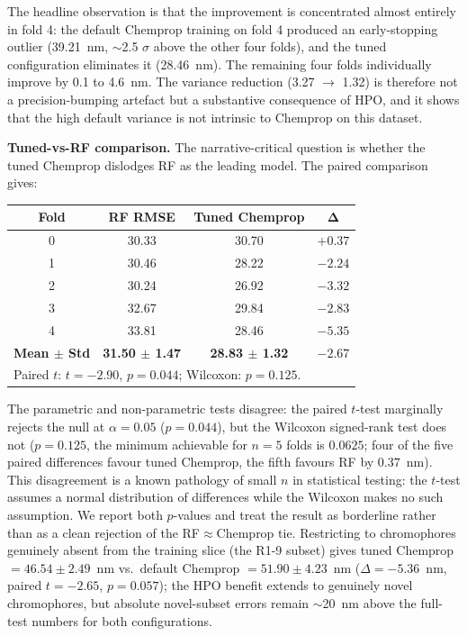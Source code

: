 \documentclass[11pt]{article}
\begin{document}
{The headline observation is that the improvement is concentrated almost entirely in fold 4: the default Chemprop training on fold 4 produced an early-stopping outlier (39.21~nm, $\sim$2.5 $\sigma$ above the other four folds), and the tuned configuration eliminates it (28.46~nm). The remaining four folds individually improve by 0.1 to 4.6~nm. The variance reduction (3.27 $\to$ 1.32) is therefore not a precision-bumping artefact but a substantive consequence of HPO, and it shows that the high default variance is not intrinsic to Chemprop on this dataset.

\textbf{Tuned-vs-RF comparison.} The narrative-critical question is whether the tuned Chemprop dislodges RF as the leading model. The paired comparison gives:
\begin{center}\small
\begin{tabular}{cccc}
\toprule
\textbf{Fold} & \textbf{RF RMSE} & \textbf{Tuned Chemprop} & $\boldsymbol{\Delta}$ \\
\midrule
0 & 30.33 & 30.70 & $+0.37$ \\
1 & 30.46 & 28.22 & $-2.24$ \\
2 & 30.24 & 26.92 & $-3.32$ \\
3 & 32.67 & 29.84 & $-2.83$ \\
4 & 33.81 & 28.46 & $-5.35$ \\
\midrule
\textbf{Mean $\pm$ Std} & \textbf{31.50 $\pm$ 1.47} & \textbf{28.83 $\pm$ 1.32} & \textbf{$-2.67$} \\
\bottomrule
\multicolumn{4}{l}{\footnotesize Paired $t$: $t = -2.90$, $p = 0.044$; Wilcoxon: $p = 0.125$.} \\
\end{tabular}
\end{center}
The parametric and non-parametric tests disagree: the paired $t$-test marginally rejects the null at $\alpha = 0.05$ ($p = 0.044$), but the Wilcoxon signed-rank test does not ($p = 0.125$, the minimum achievable for $n = 5$ folds is $0.0625$; four of the five paired differences favour tuned Chemprop, the fifth favours RF by $0.37$~nm). This disagreement is a known pathology of small $n$ in statistical testing: the $t$-test assumes a normal distribution of differences while the Wilcoxon makes no such assumption. We report both $p$-values and treat the result as borderline rather than as a clean rejection of the RF$\approx$Chemprop tie. Restricting to chromophores genuinely absent from the training slice (the R1-9 subset) gives tuned Chemprop $= 46.54 \pm 2.49$~nm vs.\ default Chemprop $= 51.90 \pm 4.23$~nm ($\Delta = -5.36$~nm, paired $t = -2.65$, $p = 0.057$); the HPO benefit extends to genuinely novel chromophores, but absolute novel-subset errors remain $\sim$20~nm above the full-test numbers for both configurations.

}
\end{document}
